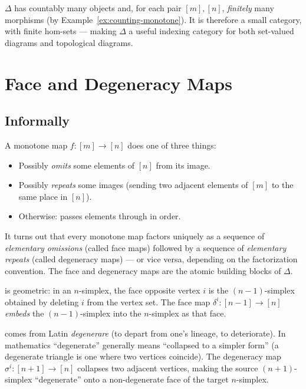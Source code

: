 \begin{remark}
$\Delta$ has countably many objects and, for each pair $[m], [n]$,
\emph{finitely} many morphisms (by Example~\ref{ex:counting-monotone}).
It is therefore a small category, with finite hom-sets — making $\Delta$
a useful indexing category for both set-valued diagrams and topological
diagrams.
\end{remark}


\section{Face and Degeneracy Maps}
\label{sec:face-degeneracy}

\subsection{Informally}

A monotone map $f : [m] \to [n]$ does one of three things:
\begin{itemize}
  \item Possibly \emph{omits} some elements of $[n]$ from its image.
  \item Possibly \emph{repeats} some images (sending two adjacent elements
        of $[m]$ to the same place in $[n]$).
  \item Otherwise: passes elements through in order.
\end{itemize}

It turns out that every monotone map factors uniquely as a sequence of
\emph{elementary omissions} (called face maps) followed by a sequence of
\emph{elementary repeats} (called degeneracy maps) — or vice versa,
depending on the factorization convention. The face and degeneracy maps
are the atomic building blocks of $\Delta$.

\begin{nameorigin}
 is geometric: in an $n$-simplex, the face opposite vertex
$i$ is the $(n-1)$-simplex obtained by deleting $i$ from the vertex set.
The face map $\delta^i : [n-1] \to [n]$ \emph{embeds} the $(n-1)$-simplex
into the $n$-simplex as that face.

 comes from Latin \emph{degenerare} (to depart from
one's lineage, to deteriorate). In mathematics ``degenerate'' generally
means ``collapsed to a simpler form'' (a degenerate triangle is one
where two vertices coincide). The degeneracy map $\sigma^i : [n+1] \to
[n]$ collapses two adjacent vertices, making the source $(n+1)$-simplex
``degenerate'' onto a non-degenerate face of the target $n$-simplex.
\end{nameorigin}

